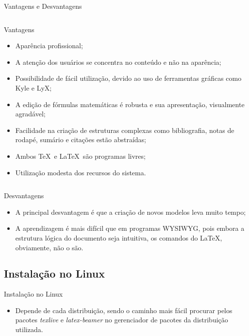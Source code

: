 \documentclass{beamer}
\begin{document}
\begin{frame}[allowframebreaks]{Vantagens e Desvantagens}
    \begin{columns}
    \column{12cm}
    \begin{block}{Vantagens}
        \begin{itemize}
        \item Aparência profissional;
        \item A atenção dos usuários se concentra no conteúdo e não na aparência;
        \item Possibilidade de fácil utilização, devido ao uso de ferramentas gráficas como Kyle e LyX;
        \item A edição de fórmulas matemáticas é robusta e sua apresentação, visualmente agradável;
        \item Facilidade na criação de estruturas complexas como bibliografia, notas de rodapé, sumário e citações estão abstraídas;
        \item Ambos \TeX\ e \LaTeX\ são programas livres;
        \item Utilização modesta dos recursos do sistema.
        \end{itemize}
    \end{block}
    \end{columns}

    \begin{block}{Desvantagens}
        \begin{itemize}
        \item A principal desvantagem é que a criação de novos modelos leva muito tempo;
        \item A aprendizagem é mais difícil que em programas WYSIWYG, pois embora a estrutura lógica do documento seja intuitiva, os comandos do LaTeX, obviamente, não o são.
        \end{itemize}
    \end{block}
\end{frame}

\subsection{Instalação no Linux}

\begin{frame}{Instalação no Linux}
    \begin{itemize}
    \item Depende de cada distribuição, sendo o caminho mais fácil procurar pelos pacotes \textit{texlive} e \textit{latex-beamer} no gerenciador de pacotes da distribuição utilizada.
    \end{itemize}
\end{frame}
\end{document}
